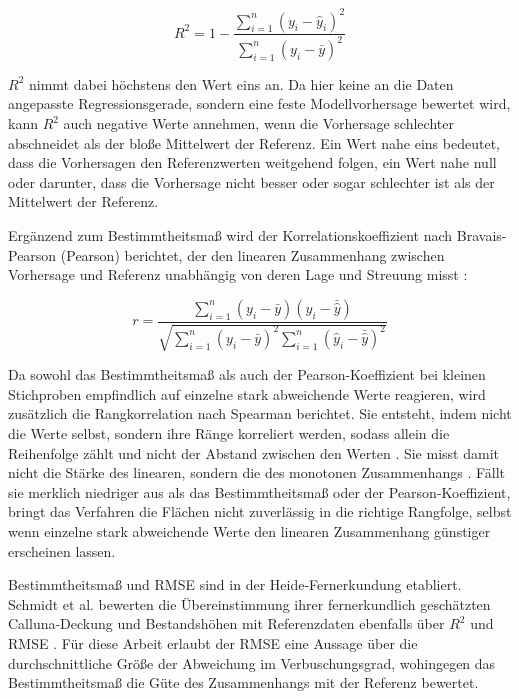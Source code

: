 \[
    R^2 = 1 - \frac{\sum_{i=1}^{n} (y_i - \hat{y}_i)^2}{\sum_{i=1}^{n} (y_i - \bar{y})^2}
\]

$R^2$ nimmt dabei höchstens den Wert eins an. Da hier keine an die Daten angepasste Regressionsgerade, sondern eine feste Modellvorhersage bewertet wird, kann $R^2$ auch negative Werte annehmen, wenn die Vorhersage schlechter abschneidet als der bloße Mittelwert der Referenz. Ein Wert nahe eins bedeutet, dass die Vorhersagen den Referenzwerten weitgehend folgen, ein Wert nahe null oder darunter, dass die Vorhersage nicht besser oder sogar schlechter ist als der Mittelwert der Referenz.

Ergänzend zum Bestimmtheitsmaß wird der Korrelationskoeffizient nach Bravais-Pearson (Pearson) berichtet, der den linearen Zusammenhang zwischen Vorhersage und Referenz unabhängig von deren Lage und Streuung misst \cite{Fahrmeir.2023}:

\[
    r = \frac{\sum_{i=1}^{n} (y_i - \bar{y})(\hat{y}_i - \bar{\hat{y}})}{\sqrt{\sum_{i=1}^{n} (y_i - \bar{y})^2 \sum_{i=1}^{n} (\hat{y}_i - \bar{\hat{y}})^2}}
\]

Da sowohl das Bestimmtheitsmaß als auch der Pearson-Koeffizient bei kleinen Stichproben empfindlich auf einzelne stark abweichende Werte reagieren, wird zusätzlich die Rangkorrelation nach Spearman berichtet. Sie entsteht, indem nicht die Werte selbst, sondern ihre Ränge korreliert werden, sodass allein die Reihenfolge zählt und nicht der Abstand zwischen den Werten \cite{Fahrmeir.2023}. Sie misst damit nicht die Stärke des linearen, sondern die des monotonen Zusammenhangs \cite{Fahrmeir.2023}. Fällt sie merklich niedriger aus als das Bestimmtheitsmaß oder der Pearson-Koeffizient, bringt das Verfahren die Flächen nicht zuverlässig in die richtige Rangfolge, selbst wenn einzelne stark abweichende Werte den linearen Zusammenhang günstiger erscheinen lassen.

Bestimmtheitsmaß und RMSE sind in der Heide-Fernerkundung etabliert. Schmidt et al. bewerten die Übereinstimmung ihrer fernerkundlich geschätzten Calluna-Deckung und Bestandshöhen mit Referenzdaten ebenfalls über $R^2$ und RMSE \cite{Schmidt.2017}. Für diese Arbeit erlaubt der RMSE eine Aussage über die durchschnittliche Größe der Abweichung im Verbuschungsgrad, wohingegen das Bestimmtheitsmaß die Güte des Zusammenhangs mit der Referenz bewertet.

